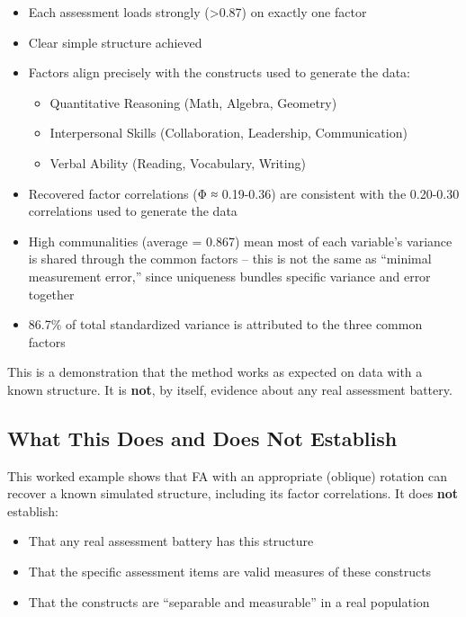 \documentclass[
]{article}
\begin{document}
\begin{itemize}
\item
  Each assessment loads strongly (\textgreater0.87) on exactly one
  factor
\item
  Clear simple structure achieved
\item
  Factors align precisely with the constructs used to generate the data:

  \begin{itemize}
  \item
    Quantitative Reasoning (Math, Algebra, Geometry)
  \item
    Interpersonal Skills (Collaboration, Leadership, Communication)
  \item
    Verbal Ability (Reading, Vocabulary, Writing)
  \end{itemize}
\item
  Recovered factor correlations (Φ ≈ 0.19-0.36) are consistent with the
  0.20-0.30 correlations used to generate the data
\item
  High communalities (average = 0.867) mean most of each variable's
  variance is shared through the common factors -- this is not the same
  as ``minimal measurement error,'' since uniqueness bundles specific
  variance and error together
\item
  86.7\% of total standardized variance is attributed to the three
  common factors
\end{itemize}

This is a demonstration that the method works as expected on data with a
known structure. It is \textbf{not}, by itself, evidence about any real
assessment battery.

\subsection{What This Does and Does Not Establish}

This worked example shows that FA with an appropriate (oblique) rotation
can recover a known simulated structure, including its factor
correlations. It does \textbf{not} establish:

\begin{itemize}
\item
  That any real assessment battery has this structure
\item
  That the specific assessment items are valid measures of these
  constructs
\item
  That the constructs are ``separable and measurable'' in a real
  population
\end{itemize}
\end{document}

